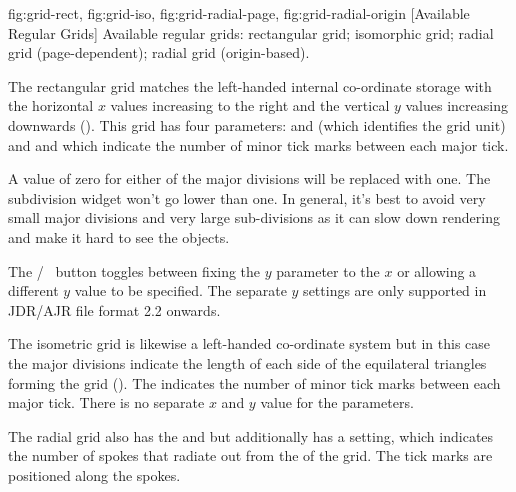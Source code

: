 {
  {fig:grid-rect}{}{},
  {fig:grid-iso}{}{},
  {fig:grid-radial-page}{}{},
  {fig:grid-radial-origin}{}{}
}
[Available Regular Grids]
{Available regular grids:
 rectangular grid;
 isomorphic grid;
 radial grid (page-dependent);
 radial grid (origin-based).}


The rectangular grid matches the left-handed internal co-ordinate
storage with the horizontal $x$ values increasing to the right and the
vertical $y$ values increasing downwards
(). This grid has four parameters:
 and  (which identifies the grid unit) and
 and  which 
indicate the number of minor tick marks between each major tick.

\begin{important}
A value of zero for either of the major divisions will be replaced
with one. The subdivision widget won't go lower than one.
In general, it's best to avoid very small major divisions and very
large sub-divisions as it can slow down \gls{rendering} and make it
hard to see the objects.
\end{important}

The  \slash\  button toggles between
fixing the $y$ parameter to the $x$ or allowing a different $y$
value to be specified. The separate $y$ settings are only supported
in \gls{JDR}\slash\gls{AJR} file format 2.2 onwards.


The isometric grid is likewise a left-handed co-ordinate system but in this case
the major divisions  indicate the length of each
side of the equilateral triangles forming the grid
(). The 
indicates the number of minor tick marks between each major tick. 
There is no separate $x$ and $y$ value for the parameters.


The radial grid also has the  and
 but additionally has a 
setting, which indicates the number of spokes that radiate out from
the  of the grid. The tick marks are positioned along
the spokes.

